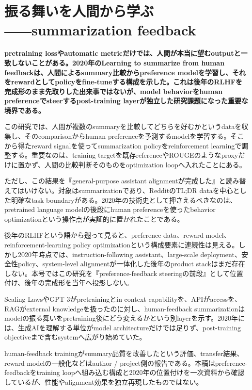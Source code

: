 \section{振る舞いを人間から学ぶ――summarization feedback}
\label{pkg:feedback-steering}
\noindent\textbf{pretraining lossやautomatic metricだけでは、人間が本当に望むoutputと一致しないことがある。2020年のLearning to summarize from human feedbackは、人間によるsummary比較からpreference modelを学習し、それをrewardとしてpolicyをfine-tuneする構成を示した。これは後年のRLHFを完成形のまま先取りした出来事ではないが、model behaviorをhuman preferenceでsteerするpost-training layerが独立した研究課題になった重要な境界である。}\autocite{src-8622fc1e22c2,src-e5838d162a66}

この研究では、人間が複数のsummaryを比較してどちらを好むかというdataを収集し、そのcomparisonからhuman preferenceを予測するmodelを学習する。そこから得たreward signalを使ってsummarization policyをreinforcement learningで調整する。重要なのは、training targetを既存referenceやROUGEのようなproxyだけに置かず、人間の比較判断そのものをoptimization loopへ入れたことにある。\autocite{src-8622fc1e22c2,src-e5838d162a66}


ただし、この結果を『general-purpose assistant alignmentが完成した』と読み替えてはいけない。対象はsummarizationであり、RedditのTL;DR dataを中心とした明確なtask boundaryがある。2020年の技術史として押さえるべきなのは、pretrained language modelの後段にhuman preferenceを使ったbehavior optimizationという操作点が実証的に置かれたことである。\autocite{src-8622fc1e22c2,src-e5838d162a66}


後年のRLHFという語から遡って見ると、preference data、reward model、reinforcement-learning policy optimizationという構成要素に連続性は見える。しかし2020年時点では、instruction-following assistant、large-scale deployment、安全性policy、system-level alignmentが一体化した後年のproduct stackはまだ存在しない。本号ではこの研究を『preference-feedback steeringの前段』として位置付け、後年の完成形を当年へ投影しない。\autocite{src-8622fc1e22c2,src-e5838d162a66}


Scaling LawsやGPT-3がpretrainingとin-context capabilityを、APIがaccessを、RAGがexternal knowledgeを扱ったのに対し、human-feedback summarizationはmodelの振る舞いをpretraining後にどう変えるかという別layerを示す。2020年には、生成AIを理解する単位がmodel architectureだけでは足りず、post-training objectiveまで含むsystemへ広がり始めていた。\autocite{src-8622fc1e22c2,src-e5838d162a66}


\begin{claimboundary}
human-feedback trainingがsummary品質を改善したという評価、transfer結果、reward modelの一般化などはauthor / project側の報告である。本稿はpreference-feedbackをtraining loopへ組み込む構成と2020年の位置付けを一次資料から確認しているが、性能やalignment効果を独立再現したものではない。\autocite{src-8622fc1e22c2,src-e5838d162a66}
\end{claimboundary}
